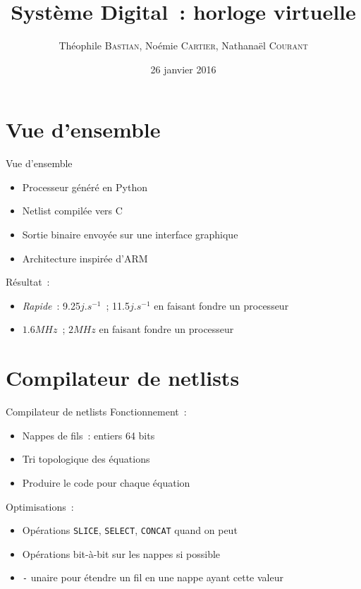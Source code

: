 \documentclass[11pt]{beamer}
\author{Théophile \textsc{Bastian}, Noémie \textsc{Cartier}, Nathanaël \textsc{Courant}}
\title{Système Digital~: horloge virtuelle}
\date{26 janvier 2016}
\begin{document}
\begin{frame}
\titlepage
\end{frame}


\section*{Vue d'ensemble}

\begin{frame}{Vue d'ensemble}
\begin{itemize}
\item Processeur généré en Python
\item Netlist compilée vers C
\item Sortie binaire envoyée sur une interface graphique
\item Architecture inspirée d'ARM
\end{itemize}
Résultat~:
\begin{itemize}
\item \textit{Rapide}~: 9.25$j.s^{-1}$~; 11.5$j.s^{-1}$ en faisant fondre un processeur
\item $1.6MHz$~; $2MHz$ en faisant fondre un processeur
\end{itemize}
\end{frame}

\begin{frame}
\setcounter{tocdepth}{1} %
\tableofcontents
\end{frame}

\section{Compilateur de netlists}
\begin{frame}{Compilateur de netlists}
Fonctionnement~:
\begin{itemize}
\item{Nappes de fils~: entiers 64 bits}
\item{Tri topologique des équations}
\item{Produire le code pour chaque équation}
\end{itemize}

Optimisations~:
\begin{itemize}
\item{Opérations \verb!SLICE!, \verb!SELECT!, \verb!CONCAT! quand on
    peut}
\item{Opérations bit-à-bit sur les nappes si possible}
\item{\og{}\verb!-!\fg{} unaire pour étendre un fil en une nappe ayant cette
    valeur}
\end{itemize}
\end{frame}
\end{document}
